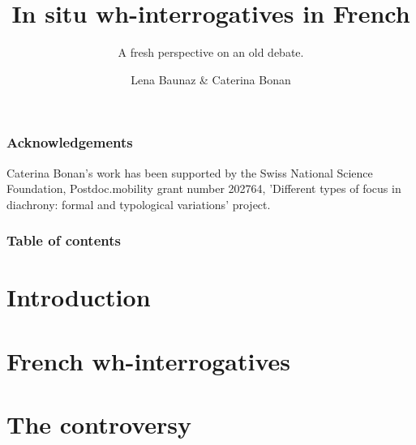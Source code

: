 \documentclass[aspectratio=169, sectionpages, codemintedoverleaf, bibref]{beamer}
\title{In situ wh-interrogatives in French}
\subtitle{A fresh perspective on an old debate.}
\author{Lena Baunaz \& Caterina Bonan}
\institute{Université de Genève; University of Cambridge}
\begin{document}
\titlepage

\begin{frame}
    \frametitle{Acknowledgements}
    \begin{center}
        Caterina Bonan's work has been supported by the Swiss National Science Foundation, Postdoc.mobility grant number 202764, 'Different types of focus in diachrony: formal and typological variations' project.
    \end{center}
\end{frame}

\begin{frame}
	\frametitle{Table of contents}
	\tableofcontents
\end{frame}

\section{Introduction}



\section{French wh-interrogatives}



\section{The controversy}

%
%
\end{document}
